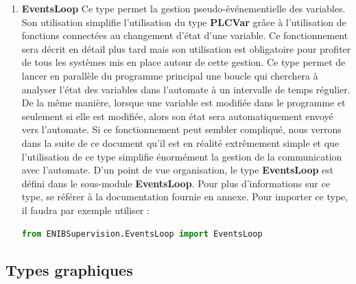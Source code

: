 \documentclass[12pt]{report}    %
\begin{document}
\begin{enumerate}
\item \textbf{EventsLoop} \newline
Ce type permet la gestion pseudo-événementielle des variables. Son utilisation simplifie l'utilisation du type \textbf{PLCVar} grâce à l'utilisation de fonctions connectées au changement d'état d'une variable. Ce fonctionnement sera décrit en détail plus tard mais son utilisation est obligatoire pour profiter de tous les systèmes mis en place autour de cette gestion.\newline
Ce type permet de lancer en parallèle du programme principal une boucle qui cherchera à analyser l'état des variables dans l'automate à un intervalle de temps régulier. De la même manière, lorsque une variable est modifiée dans le programme et seulement si elle est modifiée, alors son état sera automatiquement envoyé vers l'automate. \newline
Si ce fonctionnement peut sembler compliqué, nous verrons dans la suite de ce document qu'il est en réalité extrêmement simple et que l'utilisation de ce type simplifie énormément la gestion de la communication avec l'automate. \newline
D'un point de vue organisation, le type \textbf{EventsLoop} est défini dans le sous-module \textbf{EventsLoop}.\newline
Pour plus d'informations sur ce type, se référer à la documentation fournie en annexe.\newline
Pour importer ce type, il faudra par exemple utiliser :
\begin{lstlisting}[language=Python]
from ENIBSupervision.EventsLoop import EventsLoop
\end{lstlisting}

\end{enumerate}

\subsection{Types graphiques}
\end{document}

